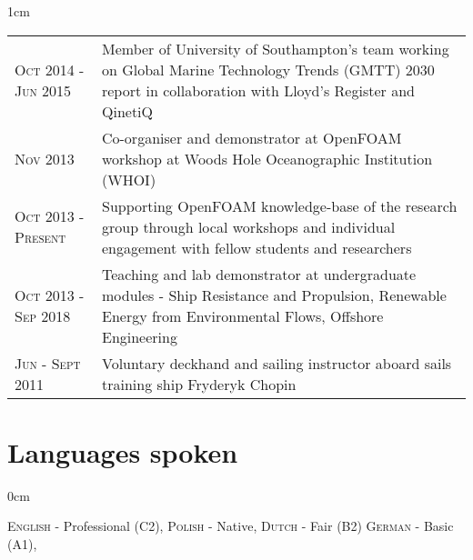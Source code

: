\documentclass[a4paper,10pt]{article}
\begin{document}
\begin{minipage}{\textwidth}
\begin{adjustwidth}{}{1cm}

{\renewcommand{\arraystretch}{1.2}
\begin{tabular}{l p{13.0cm}}
%
\textsc{Oct 2014 - Jun 2015}	& Member of University of Southampton's team working on
									Global Marine Technology Trends (GMTT) 2030 report
									in collaboration with Lloyd's Register and QinetiQ \\
%
\textsc{Nov 2013}				& Co-organiser and demonstrator at OpenFOAM workshop at Woods Hole Oceanographic Institution (WHOI) \\
%
\textsc{Oct 2013 - Present}		& Supporting OpenFOAM knowledge-base of the research group through
									local workshops and individual engagement with fellow students and researchers \\
%
\textsc{Oct 2013 - Sep 2018}		& Teaching and lab demonstrator at undergraduate modules - Ship Resistance and Propulsion,
									Renewable Energy from Environmental Flows, Offshore Engineering \\
%
%
%
\textsc{Jun - Sept 2011} 		& Voluntary deckhand and sailing instructor aboard sails training ship Fryderyk Chopin \\
%
\end{tabular}
}

\end{adjustwidth}
\end{minipage}


\section{Languages spoken}

\begin{minipage}{\textwidth}
\begin{adjustwidth}{}{0cm}

\textsc{English} - Professional (C2), %
\textsc{Polish} - Native, %
\textsc{Dutch} - Fair (B2)  %
\textsc{German} - Basic (A1),

\end{adjustwidth}
\end{minipage}
\end{document}
